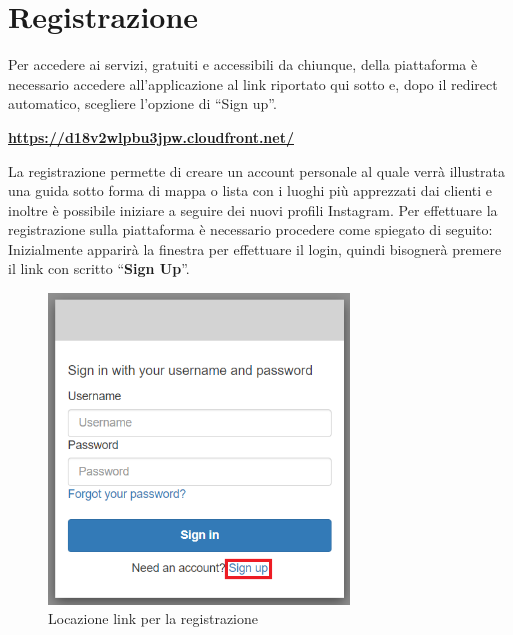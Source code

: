 \section{Registrazione} {

Per accedere ai servizi, gratuiti e accessibili da chiunque, della piattaforma \platform{} è necessario accedere all'applicazione al link riportato qui sotto e, dopo il redirect automatico, scegliere l'opzione di ``Sign up''.

\begin{center}
    \textbf{\url{https://d18v2wlpbu3jpw.cloudfront.net/}}
\end{center}

La registrazione permette di creare un account personale al quale verrà illustrata una guida sotto forma di mappa o lista con i luoghi più apprezzati dai clienti e 
inoltre è possibile iniziare a seguire dei nuovi profili Instagram. \aCapo
Per effettuare la registrazione sulla piattaforma \platform{} è necessario procedere come spiegato di seguito: \aCapo 
Inizialmente apparirà la finestra per effettuare il login, quindi bisognerà premere il link con scritto ``\textbf{Sign Up}''.
\begin{figure}[H]
    \includegraphics[width=8cm]{sezioni/images/tasto-reg.png}
    \centering
    \caption{Locazione link per la registrazione}
\end{figure}

}
